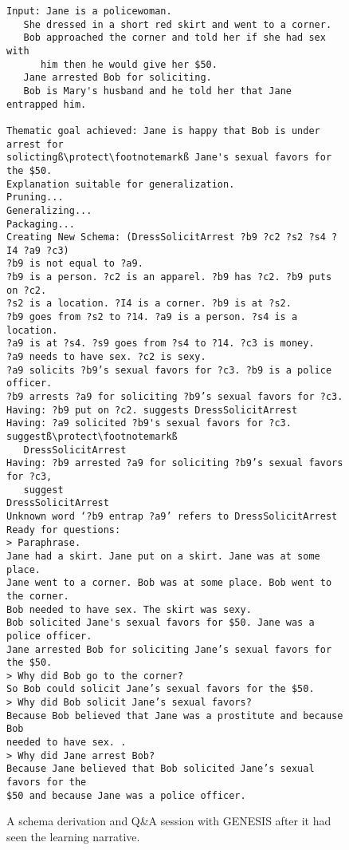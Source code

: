 \begin{figure}
    \begin{lstlisting}[frame=single,escapechar=ß]
Input: Jane is a policewoman.
   She dressed in a short red skirt and went to a corner. 
   Bob approached the corner and told her if she had sex with
      him then he would give her $50.
   Jane arrested Bob for soliciting.
   Bob is Mary's husband and he told her that Jane entrapped him.

Thematic goal achieved: Jane is happy that Bob is under arrest for
solictingß\protect\footnotemarkß Jane's sexual favors for the $50.
Explanation suitable for generalization.
Pruning...
Generalizing...
Packaging...
Creating New Schema: (DressSolicitArrest ?b9 ?c2 ?s2 ?s4 ?I4 ?a9 ?c3)
?b9 is not equal to ?a9.
?b9 is a person. ?c2 is an apparel. ?b9 has ?c2. ?b9 puts on ?c2.
?s2 is a location. ?I4 is a corner. ?b9 is at ?s2.
?b9 goes from ?s2 to ?14. ?a9 is a person. ?s4 is a location.
?a9 is at ?s4. ?s9 goes from ?s4 to ?14. ?c3 is money.
?a9 needs to have sex. ?c2 is sexy.
?a9 solicits ?b9’s sexual favors for ?c3. ?b9 is a police officer.
?b9 arrests ?a9 for soliciting ?b9’s sexual favors for ?c3.
Having: ?b9 put on ?c2. suggests DressSolicitArrest
Having: ?a9 solicited ?b9's sexual favors for ?c3. suggestß\protect\footnotemarkß
   DressSolicitArrest
Having: ?b9 arrested ?a9 for soliciting ?b9’s sexual favors for ?c3,
   suggest
DressSolicitArrest
Unknown word ‘?b9 entrap ?a9’ refers to DressSolicitArrest
Ready for questions:
> Paraphrase.
Jane had a skirt. Jane put on a skirt. Jane was at some place.
Jane went to a corner. Bob was at some place. Bob went to the corner.
Bob needed to have sex. The skirt was sexy.
Bob solicited Jane's sexual favors for $50. Jane was a police officer.
Jane arrested Bob for soliciting Jane’s sexual favors for the $50.
> Why did Bob go to the corner?
So Bob could solicit Jane’s sexual favors for the $50.
> Why did Bob solicit Jane’s sexual favors?
Because Bob believed that Jane was a prostitute and because Bob
needed to have sex. .
> Why did Jane arrest Bob?
Because Jane believed that Bob solicited Jane’s sexual favors for the
$50 and because Jane was a police officer.
    \end{lstlisting}
\caption{A schema derivation and Q\&A session with GENESIS after it had seen the learning narrative.}
\label{fig:genesisqa2}
\end{figure}

